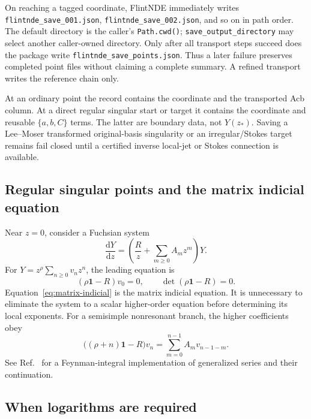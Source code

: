 \documentclass[11pt]{article}
\newcommand{\dd}{\mathrm d}
\newcommand{\Id}{\mathbf 1}
\begin{document}
On reaching a tagged coordinate, FlintNDE immediately writes
\texttt{flintnde\_save\_001.json}, \texttt{flintnde\_save\_002.json}, and so on in path
order.  The default directory is the caller's \texttt{Path.cwd()};
\texttt{save\_output\_directory} may select another caller-owned directory.  Only after all
transport steps succeed does the package write \texttt{flintnde\_save\_points.json}.  Thus a
later failure preserves completed point files without claiming a complete summary.  A
refined transport writes the reference chain only.

At an ordinary point the record contains the coordinate and the transported Acb column.  At
a direct regular singular start or target it contains the coordinate and reusable
$\{a,b,C\}$ terms.  The latter are boundary data, not $Y(z_*)$.  Saving a Lee--Moser
transformed original-basis singularity or an irregular/Stokes target remains fail closed
until a certified inverse local-jet or Stokes connection is available.

\subsection{Regular singular points and the matrix indicial equation}
\label{subsec:frobenius}

Near $z=0$, consider a Fuchsian system
\begin{equation}
  \frac{\dd Y}{\dd z}
  =\left(\frac{R}{z}+\sum_{m\geq0}A_m z^m\right)Y.
  \label{eq:fuchsian-system}
\end{equation}
For $Y=z^\rho\sum_{n\geq0}v_nz^n$, the leading equation is
\begin{equation}
  (\rho\Id-R)v_0=0,
  \qquad
  \det(\rho\Id-R)=0.
  \label{eq:matrix-indicial}
\end{equation}
Equation~\eqref{eq:matrix-indicial} is the matrix indicial equation.  It is unnecessary to
eliminate the system to a scalar higher-order equation before determining its local
exponents.  For a semisimple nonresonant branch, the higher coefficients obey
\begin{equation}
  \bigl((\rho+n)\Id-R\bigr)v_n
  =\sum_{m=0}^{n-1}A_m v_{n-1-m}.
  \label{eq:frobenius-recurrence}
\end{equation}
See Ref.~\cite{Moriello:2019yhu} for a Feynman-integral implementation of generalized
series and their continuation.

\subsection{When logarithms are required}
\label{subsec:log}
\end{document}
